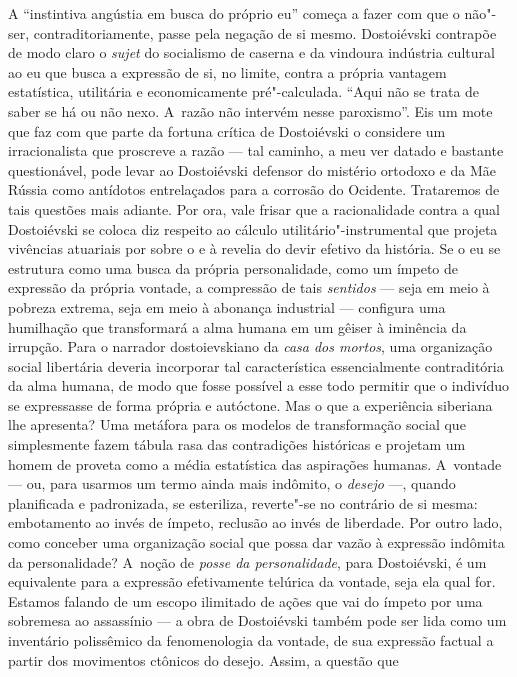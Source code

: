 A ``instintiva angústia em busca do próprio eu'' começa a fazer com que
o não"-ser, contraditoriamente, passe pela negação de si mesmo.
Dostoiévski contrapõe de modo claro o \emph{sujet} do socialismo de
caserna e da vindoura indústria cultural ao eu que busca a expressão de
si, no limite, contra a própria vantagem estatística, utilitária e
economicamente pré"-calculada. ``Aqui não se trata de saber se há ou não
nexo. A~razão não intervém nesse paroxismo''. Eis um mote que faz com
que parte da fortuna crítica de Dostoiévski o considere um
irracionalista que proscreve a razão --- tal caminho, a meu ver datado e
bastante questionável, pode levar ao Dostoiévski defensor do mistério
ortodoxo e da Mãe Rússia como antídotos entrelaçados para a corrosão do
Ocidente. Trataremos de tais questões mais adiante. Por ora, vale frisar
que a racionalidade contra a qual Dostoiévski se coloca diz respeito ao
cálculo utilitário"-instrumental que projeta vivências atuariais por
sobre o e à revelia do devir efetivo da história. Se o eu se estrutura
como uma busca da própria personalidade, como um ímpeto de expressão da
própria vontade, a compressão de tais \emph{sentidos} --- seja em meio à
pobreza extrema, seja em meio à abonança industrial --- configura uma
humilhação que transformará a alma humana em um gêiser à iminência da
irrupção. Para o narrador dostoievskiano da \emph{casa dos mortos}, uma
organização social libertária deveria incorporar tal característica
essencialmente contraditória da alma humana, de modo que fosse possível
a esse todo permitir que o indivíduo se expressasse de forma própria e
autóctone. Mas o que a experiência siberiana lhe apresenta? Uma metáfora
para os modelos de transformação social que simplesmente fazem tábula
rasa das contradições históricas e projetam um homem de proveta como a
média estatística das aspirações humanas. A~vontade --- ou, para usarmos
um termo ainda mais indômito, o \emph{desejo} ---, quando planificada e
padronizada, se esteriliza, reverte"-se no contrário de si mesma:
embotamento ao invés de ímpeto, reclusão ao invés de liberdade. Por
outro lado, como conceber uma organização social que possa dar vazão à
expressão indômita da personalidade? A~noção de \emph{posse da
personalidade}, para Dostoiévski, é um equivalente para a expressão
efetivamente telúrica da vontade, seja ela qual for. Estamos falando de
um escopo ilimitado de ações que vai do ímpeto por uma sobremesa ao
assassínio --- a obra de Dostoiévski também pode ser lida como um
inventário polissêmico da fenomenologia da vontade, de sua expressão
factual a partir dos movimentos ctônicos do desejo. Assim, a questão que
